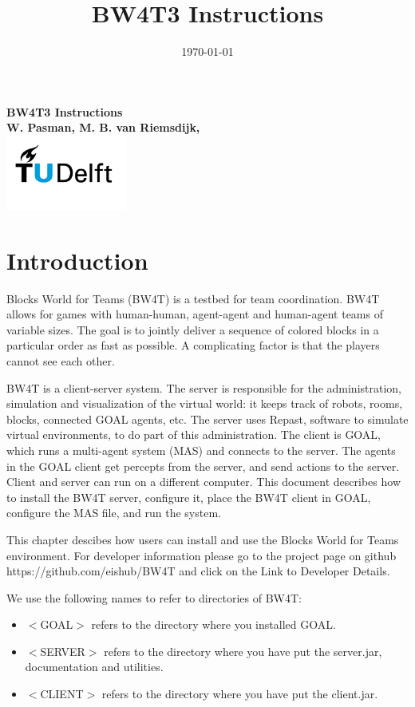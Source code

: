 \documentclass[11pt,a4paper]{article}
\title{BW4T3 Instructions}
\date{\today}
\begin{document}
\begin{titlepage}
    \centering
    \vfill
    {\bfseries\Large
        BW4T3 Instructions\\
        \vskip2cm
        W. Pasman, M. B. van Riemsdijk, \\
    }    
    \vfill
    \includegraphics[width=4cm]{TUD.png}
    \vfill
    \vfill
\end{titlepage}

\tableofcontents

\newpage

\section{Introduction}
Blocks World for Teams (BW4T) is a testbed for team coordination. BW4T allows for games with human-human, agent-agent and human-agent teams of variable sizes. The goal is to jointly deliver a sequence of colored blocks in a particular order as fast as possible. A complicating factor is that the players cannot see each other.

BW4T is a client-server system. The server is responsible for the administration, simulation and visualization of the virtual world: it keeps track of robots, rooms, blocks, connected GOAL agents, etc. The server uses Repast, software to simulate virtual environments, to do part of this administration. The client is GOAL, which runs a multi-agent system (MAS) and connects to the server. The agents in the GOAL client get percepts from the server, and send actions to the server. Client and server can run on a different computer. This document describes how to install the BW4T server, configure it, place the BW4T client in GOAL, configure the MAS file, and run the system.

This chapter descibes how users can install and use the Blocks World for Teams environment. For developer information please go to the project page on github  https://github.com/eishub/BW4T and click on the Link to Developer Details.

We use the following names to refer to directories of BW4T:
\begin{itemize}
\item $<$GOAL$>$ refers to the directory where you installed GOAL.
\item $<$SERVER$>$ refers to the directory where you have put the server.jar, documentation and utilities.
\item $<$CLIENT$>$ refers to the directory where you have put the client.jar.
\end{itemize}
\end{document}
